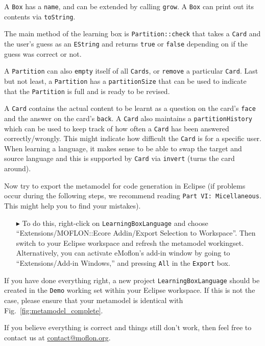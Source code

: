 A \texttt{Box} has a \texttt{name}, and can be extended by calling \texttt{grow}.
A \texttt{Box} can print out its contents via \texttt{toString}.

The main method of the learning box is \texttt{Partition::check} that takes a \texttt{Card} and the user's guess as an \texttt{EString} and returns \texttt{true} or \texttt{false} depending on if the guess was correct or not.

\pagebreak

A \texttt{Partition} can also \texttt{empty} itself of all \texttt{Cards}, or \texttt{remove} a particular \texttt{Card}.
Last but not least, a \texttt{Partition} has a \texttt{partitionSize} that can be used to indicate that the \texttt{Partition} is full and is ready to be revised.

A \texttt{Card} contains the actual content to be learnt as a question on the card's \texttt{face} and the answer on the card's \texttt{back}.
A \texttt{Card} also maintains a \texttt{partition\-History} which can be used to keep track of how often a \texttt{Card} has been answered correctly/wrongly.
This might indicate how difficult the \texttt{Card} is for a specific user.
When learning a language, it makes sense to be able to swap the target and source language and this is supported by \texttt{Card} via \texttt{invert} (turns the card around).

Now try to export the metamodel for code generation in Eclipse (if problems occur during the following steps, we recommend reading \texttt{Part VI: Micellaneous}. This might help you to find your mistakes).

\begin{enumerate}
\item[$\blacktriangleright$] To do this, right-click on \texttt{LearningBoxLanguage} and choose ``Extensions/MOFLON::Ecore Addin/Export Selection to Workspace''.
Then switch to your Eclipse work\-space and refresh the metamodel workingset. Alternatively, you can activate eMoflon's add-in window by going to ``Extensions/Add-in Windows,'' and pressing \texttt{All} in the \texttt{Export} box.
\end{enumerate}


If you have done everything right, a new project \texttt{LearningBoxLanguage} should be created in the \texttt{Demo} working set within your Eclipse workspace.
If this is not the case, please ensure that your metamodel is identical with Fig.~\ref{fig:metamodel_complete}.

If you believe everything is correct and things still don't work, then feel free to contact us at \href{mailto:contact@moflon.org}{contact@moflon.org}.

